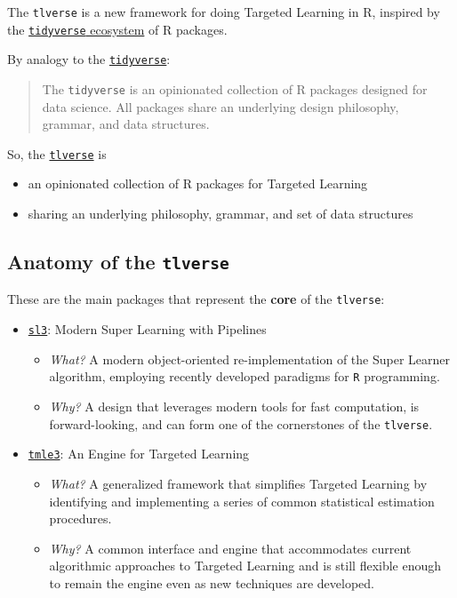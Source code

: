 \documentclass[12pt, krantz2,]{krantz}
\providecommand{\tightlist}{%
  \setlength{\itemsep}{0pt}\setlength{\parskip}{0pt}}
\theoremstyle{definition}
\theoremstyle{definition}
\theoremstyle{definition}
\newcommand{\1}{\mathbbm{1}}
\begin{document}
The \texttt{tlverse} is a new framework for doing Targeted Learning in R, inspired by
the \href{https://tidyverse.org}{\texttt{tidyverse} ecosystem} of R packages.

By analogy to the \href{https://tidyverse.org/}{\texttt{tidyverse}}:

\begin{quote}
The \texttt{tidyverse} is an opinionated collection of R packages designed for data
science. All packages share an underlying design philosophy, grammar, and data
structures.
\end{quote}

So, the \href{https://tlverse.org}{\texttt{tlverse}} is

\begin{itemize}
\tightlist
\item
  an opinionated collection of R packages for Targeted Learning
\item
  sharing an underlying philosophy, grammar, and set of data structures
\end{itemize}

\hypertarget{anatomy-of-the-tlverse}{%
\subsection*{\texorpdfstring{Anatomy of the \texttt{tlverse}}{Anatomy of the tlverse}}\label{anatomy-of-the-tlverse}}


These are the main packages that represent the \textbf{core} of the \texttt{tlverse}:

\begin{itemize}
\tightlist
\item
  \href{https://github.com/tlverse/sl3}{\texttt{sl3}}: Modern Super Learning with Pipelines

  \begin{itemize}
  \tightlist
  \item
    \emph{What?} A modern object-oriented re-implementation of the Super Learner
    algorithm, employing recently developed paradigms for \texttt{R} programming.
  \item
    \emph{Why?} A design that leverages modern tools for fast computation, is
    forward-looking, and can form one of the cornerstones of the \texttt{tlverse}.
  \end{itemize}
\item
  \href{https://github.com/tlverse/tmle3}{\texttt{tmle3}}: An Engine for Targeted Learning

  \begin{itemize}
  \tightlist
  \item
    \emph{What?} A generalized framework that simplifies Targeted Learning by
    identifying and implementing a series of common statistical estimation
    procedures.
  \item
    \emph{Why?} A common interface and engine that accommodates current algorithmic
    approaches to Targeted Learning and is still flexible enough to remain the
    engine even as new techniques are developed.
  \end{itemize}
\end{itemize}
\end{document}
